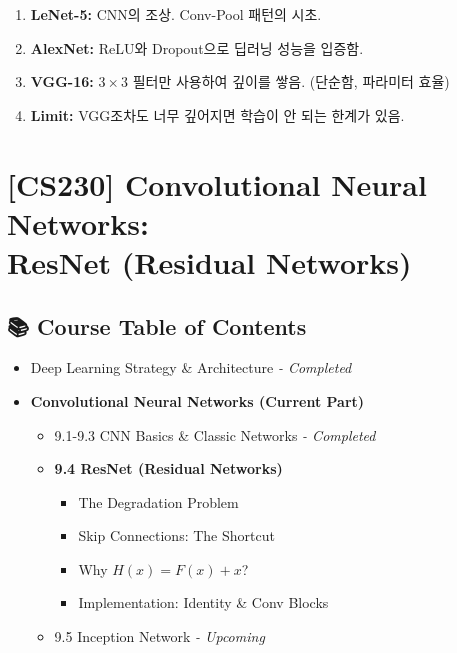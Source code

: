 \documentclass[11pt,a4paper]{book}
\theoremstyle{definition}
\begin{document}
\vspace{0.5cm}

\begin{summarybox}[title={단원 요약 (Cheat Sheet)}]
\begin{enumerate}
    \item \textbf{LeNet-5:} CNN의 조상. Conv-Pool 패턴의 시초.
    \item \textbf{AlexNet:} ReLU와 Dropout으로 딥러닝 성능을 입증함.
    \item \textbf{VGG-16:} $3 \times 3$ 필터만 사용하여 깊이를 쌓음. (단순함, 파라미터 효율)
    \item \textbf{Limit:} VGG조차도 너무 깊어지면 학습이 안 되는 한계가 있음.
\end{enumerate}
\end{summarybox}


\chapter{[CS230] Convolutional Neural Networks: \\ ResNet (Residual Networks)}
\label{ch:lecture32}

\section*{📚 Course Table of Contents}
\begin{itemize}
    \item[Chapter 1-8.] Deep Learning Strategy \& Architecture \textit{- Completed}
    \item[\textbf{Chapter 9.}] \textbf{Convolutional Neural Networks (Current Part)}
    \begin{itemize}
        \item 9.1-9.3 CNN Basics \& Classic Networks \textit{- Completed}
        \item \textbf{9.4 ResNet (Residual Networks)}
        \begin{itemize}
            \item The Degradation Problem
            \item Skip Connections: The Shortcut
            \item Why $H(x) = F(x) + x$?
            \item Implementation: Identity \& Conv Blocks
        \end{itemize}
        \item 9.5 Inception Network \textit{- Upcoming}
    \end{itemize}
\end{itemize}
\end{document}
